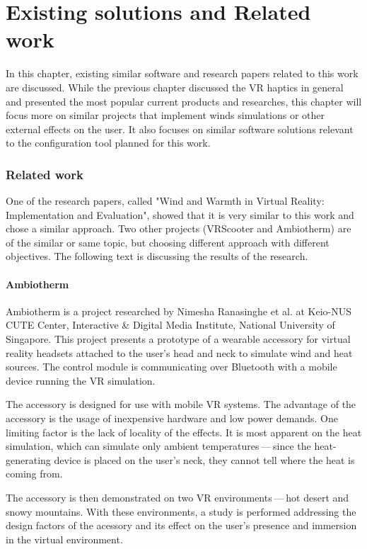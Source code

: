 \chapter{Existing solutions and Related work}

In this chapter, existing similar software and research papers related to this
work are discussed. While the previous chapter discussed the VR haptics in
general and presented the most popular current products and researches, this
chapter will focus more on similar projects that implement winds simulations
or other external effects on the user. It also focuses on similar software
solutions relevant to the configuration tool planned for this work.


\hypertarget{x-related-work}{\subsection*{Related work}}
One of the research papers, called
"Wind and Warmth in Virtual Reality: Implementation and Evaluation",
showed that it is very similar to this work and chose a similar approach. Two
other projects (VRScooter and Ambiotherm) are of the similar or same topic,
but choosing different approach with different objectives.
The following text is discussing the results of the research.


\hypertarget{x-ambiotherm}{\subsubsection*{Ambiotherm}}
Ambiotherm is a project researched by Nimesha Ranasinghe et al. at Keio-NUS
CUTE Center, Interactive \& Digital Media Institute, National University of
Singapore. This project presents a prototype of a wearable accessory for virtual
reality headsets attached to the user’s head and neck to simulate wind
and heat sources. The control module is communicating over Bluetooth with
a mobile device running the VR simulation.


The accessory is designed for use with mobile VR systems.
The advantage of the accessory is the usage of inexpensive hardware and low power
demands. One limiting factor is the lack of locality of the effects.
It is most apparent on the heat simulation, which can simulate
only ambient temperatures — since the heat-generating device is
placed on the user’s neck, they cannot tell where the heat is coming from.


The accessory is then demonstrated on two VR environments — hot desert and
snowy mountains. With these environments, a study is performed addressing the
design factors of the acessory and its effect on the user’s presence
and immersion in the virtual environment.


